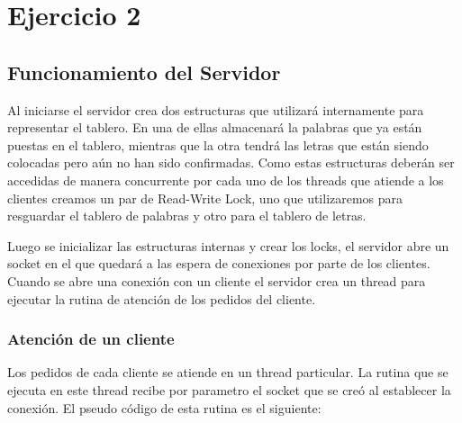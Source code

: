 \documentclass[a4,11pt]{article}
\begin{document}

\section{Ejercicio 2}
\subsection{Funcionamiento del Servidor}
	Al iniciarse el servidor crea dos estructuras que utilizará internamente para representar el tablero. En una de ellas almacenará la palabras que ya están puestas en el tablero, mientras que la otra tendrá las letras que están siendo colocadas pero aún no han sido confirmadas. Como estas estructuras deberán ser accedidas de manera concurrente por cada uno de los threads que atiende a los clientes creamos un par de Read-Write Lock, uno que utilizaremos para resguardar el tablero de palabras y otro para el tablero de letras.
	
	Luego se inicializar las estructuras internas y crear los locks, el servidor abre un socket en el que quedará a las espera de conexiones por parte de los clientes. Cuando se abre una conexión con un cliente el servidor crea un thread para ejecutar la rutina de atención de los pedidos del cliente.

\subsubsection{Atención de un cliente}
	Los pedidos de cada cliente se atiende en un thread particular. La rutina que se ejecuta en este thread recibe por parametro el socket que se creó al establecer la conexión.
	El pseudo código de esta rutina es el siguiente:
	
	
\end{document}
